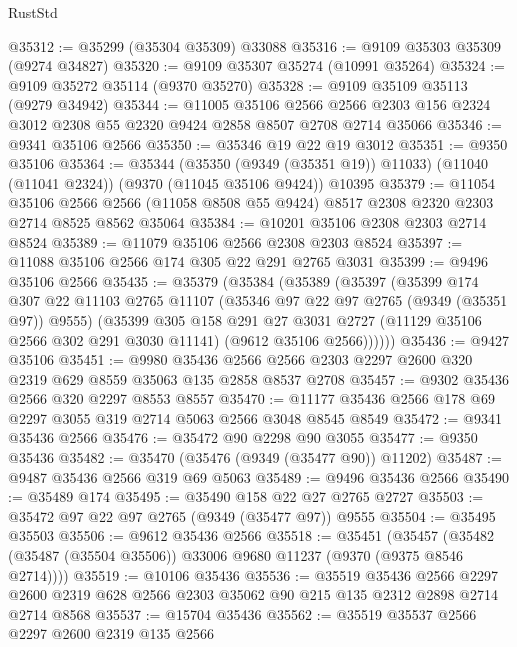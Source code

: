 \begin{lexlean}{RustStd}
\begin{coremodule}
{\begin{coremodule}
{{{{{{{{{{{{{{{{{{{{{{{{{{{{{{{{{{{{{{{@35312 := @35299 (@35304 @35309) @33088
@35316 := @9109 @35303 @35309 (@9274 @34827)
@35320 := @9109 @35307 @35274 (@10991 @35264)
@35324 := @9109 @35272 @35114 (@9370 @35270)
@35328 := @9109 @35109 @35113 (@9279 @34942)
@35344 := @11005
    @35106
    @2566
    @2566
    @2303
    @156
    @2324
    @3012
    @2308
    @55
    @2320
    @9424
    @2858
    @8507
    @2708
    @2714
    @35066
@35346 := @9341 @35106 @2566
@35350 := @35346 @19 @22 @19 @3012
@35351 := @9350 @35106
@35364 := @35344
    (@35350 (@9349 (@35351 @19)) @11033)
    (@11040 (@11041 @2324))
    (@9370 (@11045 @35106 @9424))
    @10395
@35379 := @11054
    @35106
    @2566
    @2566
    (@11058 @8508 @55 @9424)
    @8517
    @2308
    @2320
    @2303
    @2714
    @8525
    @8562
    @35064
@35384 := @10201 @35106 @2308 @2303 @2714 @8524
@35389 := @11079 @35106 @2566 @2308 @2303 @8524
@35397 := @11088 @35106 @2566 @174 @305 @22 @291 @2765 @3031
@35399 := @9496 @35106 @2566
@35435 := @35379
    (@35384
      (@35389
        (@35397
          (@35399
            @174
            @307
            @22
            @11103
            @2765
            @11107
            (@35346 @97 @22 @97 @2765 (@9349 (@35351 @97)) @9555)
            (@35399
              @305
              @158
              @291
              @27
              @3031
              @2727
              (@11129 @35106 @2566 @302 @291 @3030 @11141)
              (@9612 @35106 @2566))))))
@35436 := @9427 @35106
@35451 := @9980
    @35436
    @2566
    @2566
    @2303
    @2297
    @2600
    @320
    @2319
    @629
    @8559
    @35063
    @135
    @2858
    @8537
    @2708
@35457 := @9302 @35436 @2566 @320 @2297 @8553 @8557
@35470 := @11177 @35436 @2566 @178 @69 @2297 @3055 @319 @2714 @5063 @2566 @3048 @8545 @8549
@35472 := @9341 @35436 @2566
@35476 := @35472 @90 @2298 @90 @3055
@35477 := @9350 @35436
@35482 := @35470 (@35476 (@9349 (@35477 @90)) @11202)
@35487 := @9487 @35436 @2566 @319 @69 @5063
@35489 := @9496 @35436 @2566
@35490 := @35489 @174
@35495 := @35490 @158 @22 @27 @2765 @2727
@35503 := @35472 @97 @22 @97 @2765 (@9349 (@35477 @97)) @9555
@35504 := @35495 @35503
@35506 := @9612 @35436 @2566
@35518 := @35451
    (@35457 (@35482 (@35487 (@35504 @35506)) @33006 @9680 @11237 (@9370 (@9375 @8546 @2714))))
@35519 := @10106 @35436
@35536 := @35519
    @35436
    @2566
    @2297
    @2600
    @2319
    @628
    @2566
    @2303
    @35062
    @90
    @215
    @135
    @2312
    @2898
    @2714
    @2714
    @8568
@35537 := @15704 @35436
@35562 := @35519
    @35537
    @2566
    @2297
    @2600
    @2319
    @135
    @2566
}}}}}}}}}}}}}}}}}}}}}}}}}}}}}}}}}}}}}}}
\end{coremodule}}
\end{coremodule}
\end{lexlean}
